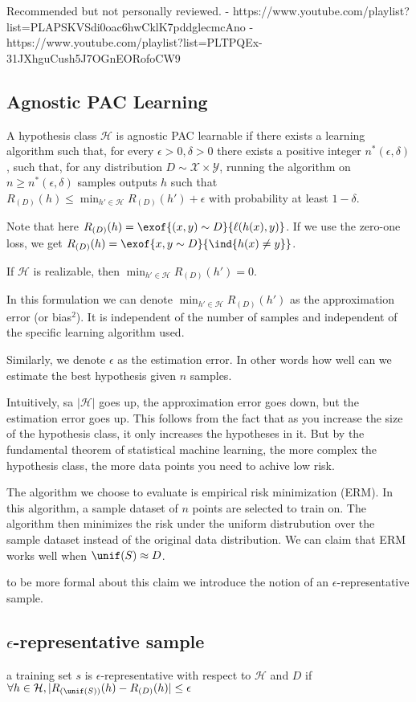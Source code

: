 Recommended but not personally reviewed. -
https://www.youtube.com/playlist?list=PLAPSKVSdi0oac6hwCklK7pddglecmcAno
-
https://www.youtube.com/playlist?list=PLTPQEx-31JXhguCush5J7OGnEORofoCW9

\hypertarget{agnostic-pac-learning}{%
\subsection{Agnostic PAC Learning}\label{agnostic-pac-learning}}

A hypothesis class \(\mathcal{H}\) is agnostic PAC learnable if there
exists a learning algorithm such that, for every
\(\epsilon > 0, \delta > 0\) there exists a positive integer
\(n^\ast(\epsilon, \delta)\), such that, for any distribution
\(D \sim \mathcal{X} \times \mathcal{Y}\), running the algorithm on
\(n \ge n^\ast(\epsilon, \delta)\) samples outputs \(h\) such that
\(R_{(D)}(h) \le \min_{h' \in \mathcal{H}} R_{(D)}(h') + \epsilon\) with
probability at least \(1-\delta\).

Note that here \(R_{(D)}(h) = \exof{(x,y)\sim D}{\ell(h(x), y)}\). If we
use the zero-one loss, we get
\(R_{(D)}(h) = \exof{{x,y}\sim D}{\ind{h(x) \not= y}}\).

If \(\mathcal{H}\) is realizable, then
\(\min_{h' \in \mathcal{H}} R_{(D)}(h') = 0\).

In this formulation we can denote
\(\min_{h' \in \mathcal{H}} R_{(D)}(h')\) as the approximation error (or
bias\(^2\)). It is independent of the number of samples and independent
of the specific learning algorithm used.

Similarly, we denote \(\epsilon\) as the estimation error. In other
words how well can we estimate the best hypothesis given \(n\) samples.

Intuitively, sa \(|\mathcal{H}|\) goes up, the approximation error goes
down, but the estimation error goes up. This follows from the fact that
as you increase the size of the hypothesis class, it only increases the
hypotheses in it. But by the fundamental theorem of statistical machine
learning, the more complex the hypothesis class, the more data points
you need to achive low risk.

The algorithm we choose to evaluate is empirical risk minimization
(ERM). In this algorithm, a sample dataset of \(n\) points are selected
to train on. The algorithm then minimizes the risk under the uniform
distrubution over the sample dataset instead of the original data
distribution. We can claim that ERM works well when
\(\unif(S) \approx D\).

to be more formal about this claim we introduce the notion of an
\(\epsilon\)-representative sample.

\hypertarget{epsilon-representative-sample}{%
\subsection{\texorpdfstring{\(\epsilon\)-representative
sample}{\textbackslash epsilon-representative sample}}\label{epsilon-representative-sample}}

a training set \(s\) is \(\epsilon\)-representative with respect to
\(\mathcal{H}\) and \(D\) if
\(\forall h \in \mathcal{H}, |R_{(\unif(S))}(h) - R_{(D)}(h)| \le \epsilon\)
